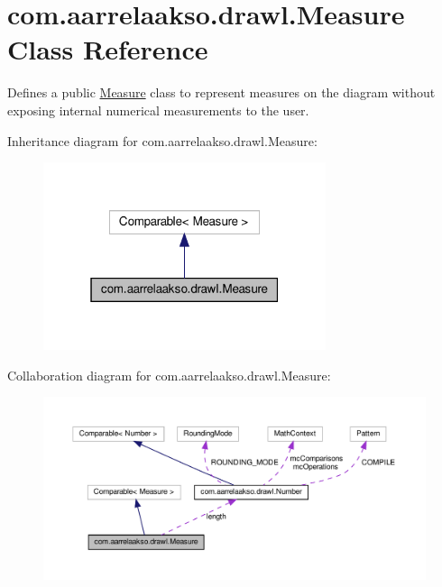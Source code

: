 \hypertarget{classcom_1_1aarrelaakso_1_1drawl_1_1_measure}{}\section{com.\+aarrelaakso.\+drawl.\+Measure Class Reference}
\label{classcom_1_1aarrelaakso_1_1drawl_1_1_measure}


Defines a public \hyperlink{classcom_1_1aarrelaakso_1_1drawl_1_1_measure}{Measure} class to represent measures on the diagram without exposing internal numerical measurements to the user.  




Inheritance diagram for com.\+aarrelaakso.\+drawl.\+Measure\+:
\nopagebreak
\begin{figure}[H]
\begin{center}
\leavevmode
\includegraphics[width=235pt]{d6/dc5/classcom_1_1aarrelaakso_1_1drawl_1_1_measure__inherit__graph}
\end{center}
\end{figure}


Collaboration diagram for com.\+aarrelaakso.\+drawl.\+Measure\+:
\nopagebreak
\begin{figure}[H]
\begin{center}
\leavevmode
\includegraphics[width=350pt]{d5/ddb/classcom_1_1aarrelaakso_1_1drawl_1_1_measure__coll__graph}
\end{center}
\end{figure}
